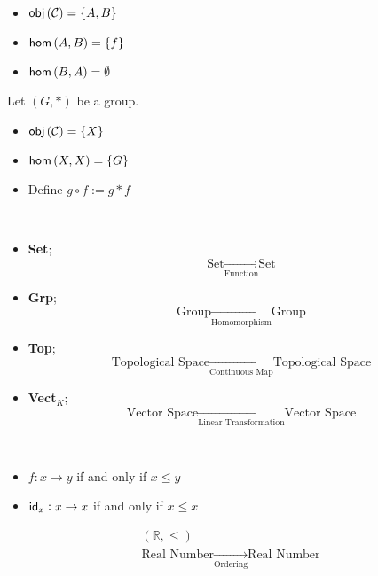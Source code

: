 \documentclass[11pt,openany]{article}
\newcommand{\R}{\mathbb{R}}
\begin{document}
\begin{example}
	\ \begin{itemize}
		\item $\mathsf{obj}\left(\mathcal{C}\right)=\set{A,B}$
		\item $\mathsf{hom}\left(A,B\right)=\set{f}$
		\item $\mathsf{hom}\left(B,A\right)=\emptyset$
	\end{itemize}
\end{example}

\begin{example}
	Let $(G,*)$ be a group. \begin{itemize}
		\item $\mathsf{obj}\left(\mathcal{C}\right)=\set{X}$
		\item $\mathsf{hom}\left(X,X\right)=\set{G}$
		\item Define $g\circ f:=g*f$
	\end{itemize}
\end{example}

\begin{example}
\ \begin{itemize}
	\item \textbf{Set};\quad $$\text{Set}\xrightarrow[\text{Function}]{}\text{Set}$$
	\item \textbf{Grp};\quad $$\text{Group}\xrightarrow[\text{Homomorphism}]{}\text{Group}$$
	\item \textbf{Top};\quad $$\text{Topological Space}\xrightarrow[\text{Continuous Map}]{}\text{Topological Space}$$
	\item \textbf{Vect}$_K$;\quad $$\text{Vector Space}\xrightarrow[\text{Linear Transformation}]{}\text{Vector Space}$$
\end{itemize}
\end{example}

\newpage
\begin{example}
	\ \begin{itemize}
		\item 
		$f:x\to y$ if and only if $x\leq y$\\
		\item $\mathsf{id}_x:x\to x$ if and only if $x\leq x$
	\end{itemize}
	\[
	\begin{array}{c}
		(\R,\leq) \\ \text{Real Number}\xrightarrow[\text{Ordering}]{}\text{Real Number}
	\end{array}
	\]
\end{example}
\end{document}
